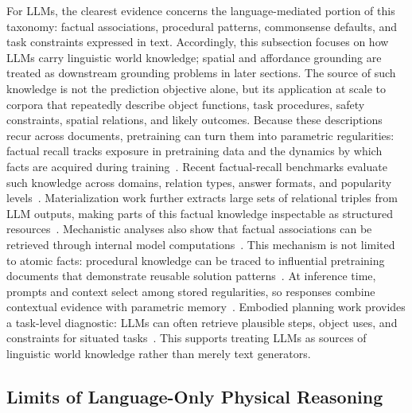 For LLMs, the clearest evidence concerns the language-mediated portion of this taxonomy: factual associations, procedural patterns, commonsense defaults, and task constraints expressed in text. 
Accordingly, this subsection focuses on how LLMs carry linguistic world knowledge; spatial and affordance grounding are treated as downstream grounding problems in later sections. 
The source of such knowledge is not the prediction objective alone, but its application at scale to corpora that repeatedly describe object functions, task procedures, safety constraints, spatial relations, and likely outcomes. 
Because these descriptions recur across documents, pretraining can turn them into parametric regularities: factual recall tracks exposure in pretraining data and the dynamics by which facts are acquired during training~\citep{kandpal2023longtail,chang2024factualpretraining}. 
Recent factual-recall benchmarks evaluate such knowledge across domains, relation types, answer formats, and popularity levels~\citep{yuan2024factbench}. 
Materialization work further extracts large sets of relational triples from LLM outputs, making parts of this factual knowledge inspectable as structured resources~\citep{hu2024gptkb}. 
Mechanistic analyses also show that factual associations can be retrieved through internal model computations~\citep{geva2023dissecting}. 
This mechanism is not limited to atomic facts: procedural knowledge can be traced to influential pretraining documents that demonstrate reusable solution patterns~\citep{ruis2025procedural}. 
At inference time, prompts and context select among stored regularities, so responses combine contextual evidence with parametric memory~\citep{tao2024context}. 
Embodied planning work provides a task-level diagnostic: LLMs can often retrieve plausible steps, object uses, and constraints for situated tasks~\citep{song2023llmplanner,rana2023sayplan,hua2024gensim2}. 
This supports treating LLMs as sources of linguistic world knowledge rather than merely text generators.

\subsection{Limits of Language-Only Physical Reasoning}

